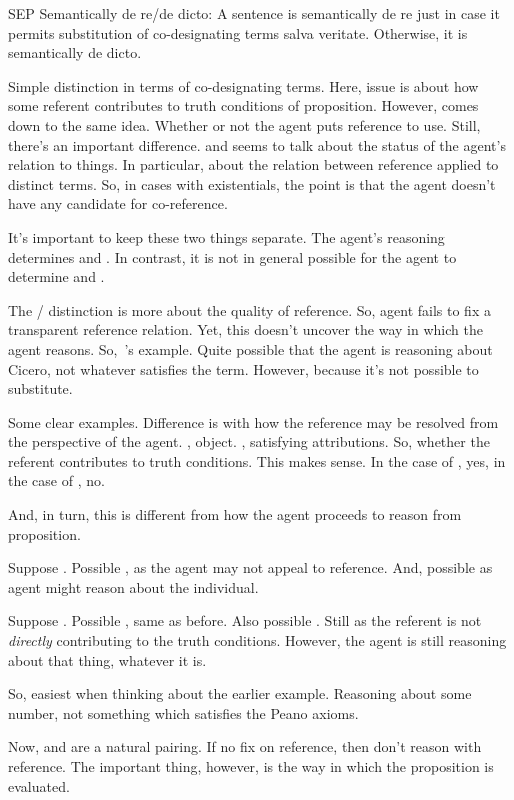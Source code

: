 \begin{note}
  SEP
  Semantically de re/de dicto:
  A sentence is semantically de re just in case it permits substitution of co-designating terms salva veritate.
  Otherwise, it is semantically de dicto.

  Simple distinction in terms of co-designating terms.
  Here, issue is about how some referent contributes to truth conditions of proposition.
  However, comes down to the same idea.
  Whether or not the agent puts reference to use.
  Still, there's an important difference.
  \dd{} and \dr{} seems to talk about the status of the agent's relation to things.
  In particular, about the relation between reference applied to distinct terms.
  So, in cases with existentials, the point is that the agent doesn't have any candidate for co-reference.

  It's important to keep these two things separate.
  The agent's reasoning determines \ur{} and \nr{}.
  In contrast, it is not in general possible for the agent to determine \dd{} and \dr{}.

  The \dd{}/\dr{} distinction is more about the quality of reference.
  So, agent fails to fix a transparent reference relation.
  Yet, this doesn't uncover the way in which the agent reasons.
  So,~\citeauthor{Fitch:1981vg}'s example.
  Quite possible that the agent is reasoning about Cicero, not whatever satisfies the term.
  However, \dd{} because it's not possible to substitute.

  Some clear examples.
  Difference is with how the reference may be resolved from the perspective of the agent.
  \dr{}, object.
  \dd{}, satisfying attributions.
  So, whether the referent contributes to truth conditions.
  This makes sense.
  In the case of \dr{}, yes, in the case of \dd{}, no.

  And, in turn, this is different from how the agent proceeds to reason from proposition.

  Suppose \dr{}.
  Possible \nr{}, as the agent may not appeal to reference.
  And, possible \ur{} as agent might reason about the individual.

  Suppose \dd{}.
  Possible \nr{}, same as before.
  Also possible \ur{}.
  Still \dd{} as the referent is not \emph{directly} contributing to the truth conditions.
  However, the agent is still reasoning about that thing, whatever it is.

  So, easiest when thinking about the earlier example.
  Reasoning about some number, not something which satisfies the Peano axioms.

  Now, \dd{} and \nr{} are a natural pairing.
  If no fix on reference, then don't reason with reference.
  The important thing, however, is the way in which the proposition is evaluated.
\end{note}

